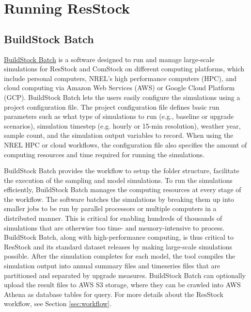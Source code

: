 \chapter{Running ResStock}
\section{BuildStock Batch}
\href{https://github.com/NREL/buildstockbatch/tree/v2023.10.0}{BuildStock Batch} is a software designed to run and manage large-scale simulations for ResStock and ComStock on different computing platforms, which include personal computers, NREL’s high performance computers (HPC), and cloud computing via Amazon Web Services (AWS) or Google Cloud Platform (GCP). BuildStock Batch lets the users easily configure the simulations using a project configuration file. The project configuration file defines basic run parameters such as what type of simulations to run (e.g., baseline or upgrade scenarios), simulation timestep (e.g. hourly or 15-min resolution), weather year, sample count, and the simulation output variables to record.  When using the NREL HPC or cloud workflows, the configuration file also specifies the amount of computing resources and time required for running the simulations.

BuildStock Batch provides the workflow to setup the folder structure, facilitate the execution of the sampling and model simulations. To run the simulations efficiently, BuildStock Batch manages the computing resources at every stage of the workflow. The software batches the simulations by breaking them up into smaller jobs to be run by parallel processors or multiple computers in a distributed manner. This is critical for enabling hundreds of thousands of simulations that are otherwise too time- and memory-intensive to process. BuildStock Batch, along with high-performance computing, is thus critical to ResStock and its standard dataset releases by making large-scale simulations possible. After the simulation completes for each model, the tool compiles the simulation output into annual summary files and timeseries files that are partitioned and separated by upgrade measures. BuildStock Batch can optionally upload the result files to AWS S3 storage, where they can be crawled into AWS Athena as database tables for query.  For more details about the ResStock workflow, see Section \ref{sec:workflow}.


